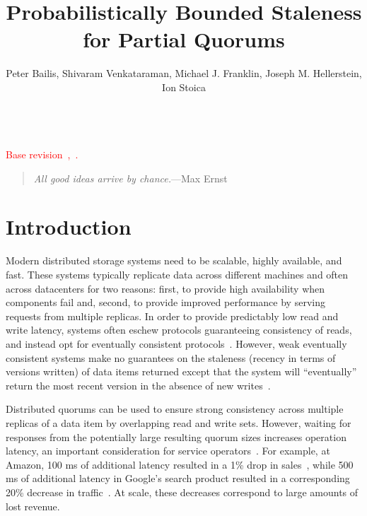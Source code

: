 \documentclass{vldb}
\title{Probabilistically Bounded Staleness for Partial Quorums}
\author{Peter Bailis, Shivaram Venkataraman, Michael J. Franklin, Joseph M. Hellerstein, Ion Stoica\\
\affaddr{University of California, Berkeley}\\
\affaddr{\{pbailis, shivaram, franklin, hellerstein, istoica\}@cs.berkeley.edu}}
\newcommand{\sectionskip}{-0em}
\begin{document}

\maketitle


\textcolor{red}{Base revision~\GITAbrHash,~\GITAuthorDate.\\[-2em]}

\begin{quote}
\textit{All good ideas arrive by chance.}---Max Ernst
\end{quote}



\vspace{\sectionskip}\section{Introduction}

Modern distributed storage systems need to be scalable, highly
available, and fast.  These systems typically replicate data across
different machines and often across datacenters for two reasons:
first, to provide high availability when components fail and, second,
to provide improved performance by serving requests from multiple
replicas.  In order to provide predictably low read and write latency,
systems often eschew protocols guaranteeing consistency of reads, and
instead opt for eventually consistent
protocols~\cite{cassandradefault, abadilatconsist, dynamo, feinbergpc,
  reddit, riaktalkone, outbrain}.  However, weak eventually consistent
systems make no guarantees on the staleness (recency in terms of
versions written) of data items returned except that the system will
``eventually'' return the most recent version in the absence of new
writes~\cite{vogels-defs}.

Distributed quorums can be used to ensure strong consistency across
multiple replicas of a data item by overlapping read and write
sets. However, waiting for responses from the potentially large
resulting quorum sizes increases operation latency, an important
consideration for service operators~\cite{perf-impact}. For example, at Amazon, 100 ms of
additional latency resulted in a 1\% drop in
sales~\cite{amazon-latency}, while 500 ms of additional latency in
Google's search product resulted in a corresponding 20\% decrease in
traffic~\cite{google-talk}.  At scale, these decreases correspond to
large amounts of lost revenue.
\end{document}
